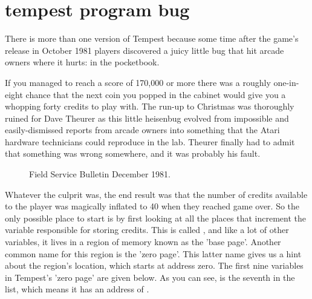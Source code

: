 \chapter{tempest program bug}
\label{sec:tempest_program_bug}
\lhead[tempest]{}
\lstset{style=6502Style}
There is more than one version of Tempest because some time after the game's
release in October 1981 players discovered a juicy little bug that hit arcade
owners where it hurts: in the pocketbook.

If you managed to reach a score of 170,000 or more there was a roughly one-in-eight chance that the next coin you
popped in the cabinet would give you a whopping forty credits to play with. The run-up
to Christmas was thoroughly ruined for Dave Theurer as this little heisenbug evolved
from impossible and easily-dismissed reports from arcade owners into something that the
Atari hardware technicians could reproduce in the lab. Theurer finally had to admit that
something was wrong somewhere, and it was probably his fault.



\begin{figure}[H]
    \centering
    \begin{adjustbox}{width=11cm,center}
    \end{adjustbox}
  \caption{Field Service Bulletin December 1981.}
\end{figure}

Whatever the culprit was, the end result was that the number of credits available to the player was
magically inflated to 40 when they reached game over. So the only possible place to start is by first
looking at all the places that increment the variable responsible for storing credits. This is called
, and like a lot of other variables, it lives in a region of memory known as the 'base page'.
Another common name for this region is the 'zero page'. This latter name gives us a hint about the region's location,
which starts at address zero. The first nine variables in Tempest's 'zero page' are given below. As you can see,
 is the seventh in the list, which means it has an address of .

